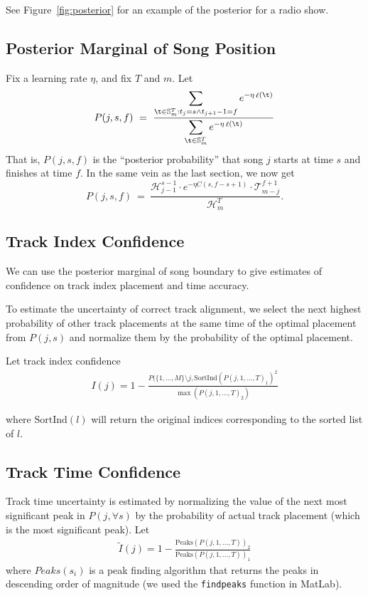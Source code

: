 \documentclass[twocolumn]{article}
\DeclareMathOperator{\loss}{\ell}
\newcommand{\segs}{\mathbb S}
\newcommand{\head}{\mathcal H}
\newcommand{\tail}{\mathcal T}
\begin{document}
See Figure~\ref{fig:posterior} for an example of the posterior for a radio show. 

\subsection{Posterior Marginal of Song Position}
Fix a learning rate $\eta$, and fix $T$ and $m$. Let
\[
P(j,s,f) ~=~ 
\frac{\displaystyle
	\sum_{\t \in \segs^T_m : t_j = s \land t_{j+1}-1 = f} e^{- \eta \loss(\t)}
}{\displaystyle
\sum_{\t \in \segs^T_m} e^{- \eta \loss(\t)}
}
\]
That is, $P(j,s,f)$ is the ``posterior probability'' that song $j$ starts at time $s$ and finishes at time $f$.
%
In the same vein as the last section, we now get
\[
P(j,s,f) ~=~ \frac{\head^{s-1}_{j-1} \cdot e^{-\eta C(s, f-s+1)} \cdot \tail^{f+1}_{m-j}}{\head^T_m}.
\]


\subsection{Track Index Confidence}

We can use the posterior marginal of song boundary to give estimates of confidence on track index placement and time accuracy.

To estimate the uncertainty of correct track alignment, we select the next highest probability of other track placements at the same time of the optimal placement from $P(j,s)$ and normalize them by the probability of the optimal placement.

Let track index confidence
\begin{align*}
I( j ) = 1-\frac{ P( \{1,\ldots,M\} \setminus j, \mathrm{SortInd}( P(j, 1,\ldots,T)_1)^2 }{ \max( P(j, 1,\ldots,T)_2) }
\end{align*}

where $\mathrm{SortInd}(l)$ will return the original indices corresponding to the sorted list of $l$. 

\subsection{Track Time Confidence}

Track time uncertainty is estimated by normalizing the value of the next most significant peak in $P(j,\forall s)$ by the probability of actual track placement (which is the most significant peak). 
Let 
\begin{align*}
\tilde I( j ) = 1-\frac{ \mathrm{Peaks}( P(j, 1,\ldots,T ) )_2 } { \mathrm{Peaks}( P(j, 1,\ldots,T ))_1 }
\end{align*} where $Peaks(s_i)$ is a peak finding algorithm that returns the peaks in descending order of magnitude (we used the \texttt{findpeaks} function in MatLab).
\end{document}
